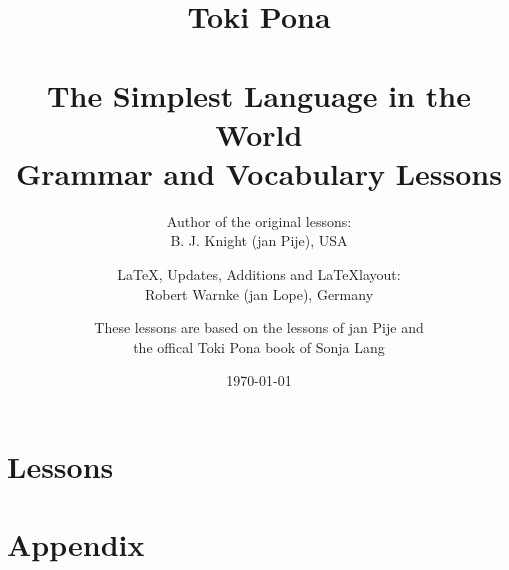 \documentclass[a4paper, 10pt]{book}
\begin{document}
\setlength{\topmargin}{-19mm}
\setlength{\headheight}{5mm}
\setlength{\headsep}{10mm}
\setlength{\textheight}{245mm}
\setlength{\textwidth}{155mm}
\setlength{\oddsidemargin}{5mm}
\setlength{\evensidemargin}{-1mm}
\setlength{\footskip}{20mm}
\setlength{\parindent}{0mm}
\setlength{\parskip}{2.0ex plus 1.0ex minus 0.5ex}
\batchmode
\title{
Toki Pona \\  \\ 
The Simplest Language in the World \\ 
Grammar and Vocabulary Lessons \\
}
\author{
Author of the original lessons: \\ B. J. Knight (jan Pije), USA \cite{www:Pije:01} \\  
\and
\LaTeX, Updates, Additions and \LaTeX layout: \\ Robert Warnke (jan Lope), Germany \cite{www:rowa:01} \\ 
\and
These lessons are based on the lessons of jan Pije and \\ 
the offical Toki Pona book of Sonja Lang \cite{www:tokipona.org} 
}

%
\date
\today
\maketitle
\tableofcontents
%
\chapter{Lessons}

















%


%
\appendix
\chapter{Appendix}
%
%






%


\printindex
\end{document}
